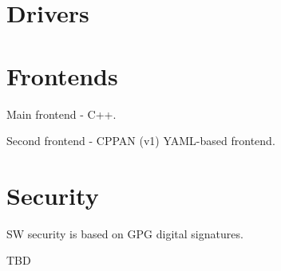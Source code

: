 \section{Drivers}

\section{Frontends}

Main frontend - C++.

Second frontend - CPPAN (v1) YAML-based frontend.

\section{Security}

SW security is based on GPG digital signatures.

TBD
